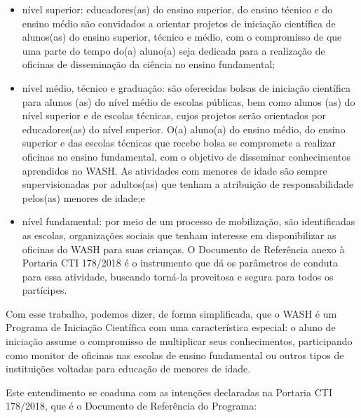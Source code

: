 \begin{itemize}
\item nível superior: educadores(as) do ensino superior, do ensino técnico e do ensino médio são convidados a orientar projetos de iniciação científica de alunos(as) do ensino superior, técnico e médio, com o compromisso de que uma parte do tempo do(a) aluno(a) seja dedicada para a realização de oficinas de disseminação da ciência no ensino fundamental;
\item nível médio, técnico e graduação: são oferecidas bolsas de iniciação científica para alunos (as) do nível médio de escolas públicas, bem como alunos (as) do nível superior e de escolas técnicas, cujos projetos serão orientados por educadores(as) do nível superior. O(a) aluno(a) do ensino médio, do ensino superior e das escolas técnicas que recebe bolsa se compromete a realizar oficinas no ensino fundamental, com o objetivo de disseminar conhecimentos aprendidos no WASH. As atividades com menores de idade são sempre supervisionadas por adultos(as) que tenham a  atribuição de responsabilidade pelos(as) menores de idade;e
\item nível fundamental: por meio de um processo de mobilização, são identificadas as escolas, organizações sociais que tenham interesse em disponibilizar as oficinas do WASH para suas crianças. O Documento de Referência anexo à Portaria CTI 178/2018 é o instrumento que dá os parâmetros de conduta para essa atividade, buscando torná-la proveitosa e segura para todos os partícipes.

\end{itemize}

Com esse trabalho, podemos dizer, de forma simplificada, que o WASH é um Programa de Iniciação Científica com uma característica especial: o aluno de iniciação assume o compromisso de multiplicar seus conhecimentos, participando como monitor de oficinas nas escolas de ensino fundamental ou outros tipos de instituições voltadas para educação de menores de idade.

Este entendimento se coaduna com as intenções declaradas na Portaria CTI 178/2018, que é o Documento de Referência do Programa:


\noindent\begin{flushright}\mbox{\linespread{1}\selectfont\centering{}}\end{flushright}


